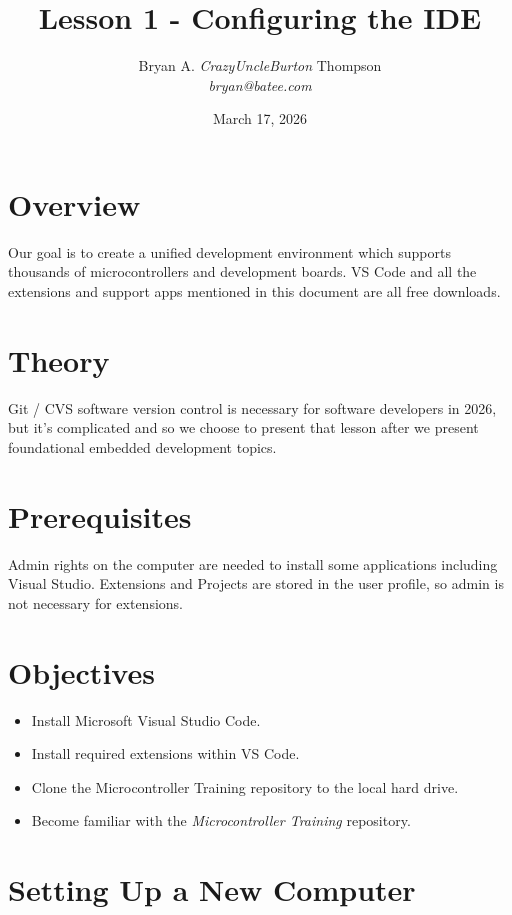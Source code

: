 \documentclass{article}
\title{Lesson 1 - Configuring the IDE}
\author{Bryan A. \textit{CrazyUncleBurton} Thompson \\ \textit{bryan@batee.com}}
\date{March 17, 2026}
\begin{document}
\maketitle


\section*{Overview}
Our goal is to create a unified development environment which supports 
thousands of microcontrollers and development boards. VS Code and all the 
extensions and support apps mentioned in this document are all free downloads.
\vspace{3mm}

\section*{Theory}
Git / CVS software version control is necessary for software developers in 
2026, but it's complicated and so we choose to present that lesson after we 
present foundational embedded development topics.
\vspace{3mm}

\section*{Prerequisites}
Admin rights on the computer are needed to install some applications including 
Visual Studio. Extensions and Projects are stored in the user profile, so 
admin is not necessary for extensions.
\vspace{3mm}

\section*{Objectives}
\begin{itemize}
  \item Install Microsoft Visual Studio Code.
  \item Install required extensions within VS Code. 
  \item Clone the Microcontroller Training repository to the local hard drive.
  \item Become familiar with the \textit{Microcontroller Training} repository.
\end{itemize}
\newpage 


\section*{Setting Up a New Computer}
\vspace{3mm}
\end{document}
